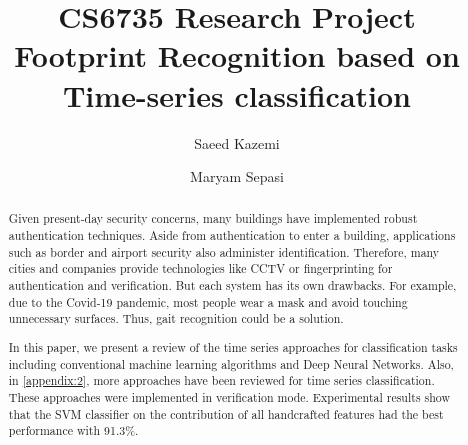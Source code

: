 \begin{frontmatter}
\title{\Huge CS6735 Research Project \\Footprint Recognition based on \\ Time-series classification }

\author{Saeed Kazemi}
\author{Maryam Sepasi}
\address{University of New Brunswick}


\begin{abstract}
Given present-day security concerns, many buildings have implemented robust authentication techniques. Aside from authentication to enter a building, applications such as border and airport security also administer identification. Therefore, many cities and companies provide technologies like CCTV or fingerprinting for authentication and verification. But each system has its own drawbacks. For example, due to the Covid-19 pandemic, most people wear a mask and avoid touching unnecessary surfaces. Thus, gait recognition could be a solution. 






In this paper, we present a review of the time series approaches for classification tasks including conventional machine learning algorithms and Deep Neural Networks. Also, in \ref{appendix:2}, more approaches have been reviewed for time series classification. These approaches were implemented in verification mode. Experimental results show that the SVM classifier on the contribution of all handcrafted features had the best performance with 91.3\%.


\end{abstract}
\end{frontmatter}
